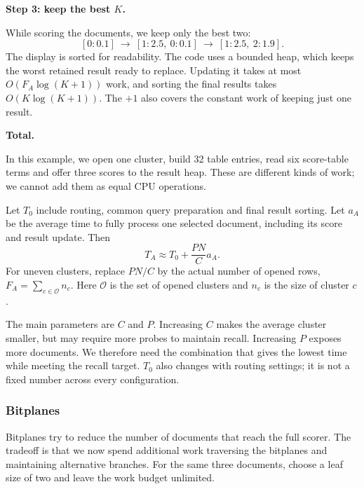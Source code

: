 \textbf{Step 3: keep the best $K$.}\par
While scoring the documents, we keep only the best two:
\[
 [0{:}0.1]\ \longrightarrow\ [1{:}2.5,\ 0{:}0.1]
 \ \longrightarrow\ \boxed{[1{:}2.5,\ 2{:}1.9]}.
\]
The display is sorted for readability. The code uses a bounded heap, which keeps the worst retained result ready to replace. Updating it takes at most $O(F_A\log(K+1))$ work, and sorting the final results takes $O(K\log(K+1))$. The $+1$ also covers the constant work of keeping just one result.

\textbf{Total.}\par
In this example, we open one cluster, build 32 table entries, read six score-table terms and offer three scores to the result heap. These are different kinds of work; we cannot add them as equal CPU operations.

Let $T_0$ include routing, common query preparation and final result sorting. Let $a_A$ be the average time to fully process one selected document, including its score and result update. Then
\[
 \boxed{T_A\approx T_0+\frac{PN}{C}a_A.}
\]
For uneven clusters, replace $PN/C$ by the actual number of opened rows, $F_A=\sum_{c\in\mathcal O}n_c$. Here $\mathcal O$ is the set of opened clusters and $n_c$ is the size of cluster $c$.

The main parameters are $C$ and $P$. Increasing $C$ makes the average cluster smaller, but may require more probes to maintain recall. Increasing $P$ exposes more documents. We therefore need the combination that gives the lowest time while meeting the recall target. $T_0$ also changes with routing settings; it is not a fixed number across every configuration.

\subsubsection{Bitplanes}
Bitplanes try to reduce the number of documents that reach the full scorer. The tradeoff is that we now spend additional work traversing the bitplanes and maintaining alternative branches. For the same three documents, choose a leaf size of two and leave the work budget unlimited.

